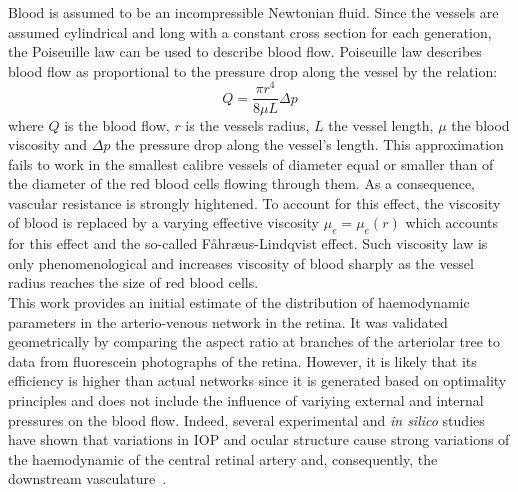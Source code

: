 \documentclass[12pt,a4paper]{article}
\begin{document}
Blood is assumed to be an incompressible Newtonian fluid.
Since the vessels are assumed cylindrical and long with a constant cross section for each generation, the Poiseuille law can be used to describe blood flow.
Poiseuille law describes blood flow as proportional to the pressure drop along the vessel by the relation:
\begin{equation}
  \label{eq:PoiseuilleLaw}
  Q = \frac{\pi r^4}{8\mu L}\Delta p
\end{equation}
where $Q$ is the blood flow, $r$ is the vessels radius, $L$ the vessel length, $\mu$ the blood viscosity and $\Delta p$ the pressure drop along the vessel's length.
This approximation fails to work in the smallest calibre vessels of diameter equal or smaller than of the diameter of the red blood cells flowing through them.
As a consequence, vascular resistance is strongly hightened.
To account for this effect, the viscosity of blood is replaced by a varying effective viscosity $\mu_e = \mu_e(r)$ which accounts for this effect and the so-called F\r{a}hr\ae us-Lindqvist effect.
Such viscosity law is only phenomenological and increases viscosity of blood sharply as the vessel radius reaches the size of red blood cells.\\
This work provides an initial estimate of the distribution of haemodynamic parameters in the arterio-venous network in the retina.
It was validated geometrically by comparing the aspect ratio at branches of the arteriolar tree to data from fluorescein photographs of the retina. 
However, it is likely that its efficiency is higher than actual networks since it is generated based on optimality principles and does not include the influence of variying external and internal pressures on the blood flow.
Indeed, several experimental and \textit{in silico} studies have shown that variations in IOP and ocular structure cause strong variations of the haemodynamic of the central retinal artery and, consequently, the downstream vasculature~\cite{Guidoboni_2014, Harris_1996}.
\end{document}
